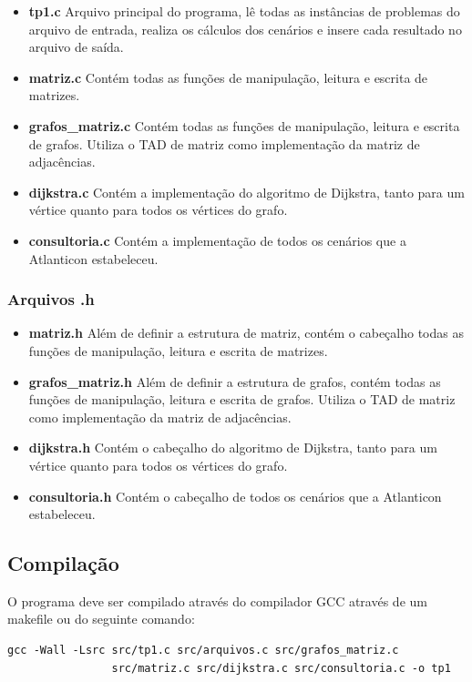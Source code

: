 \documentclass[12pt]{article}
\begin{document}
\begin{itemize}
\item \textbf{tp1.c} Arquivo principal do programa, lê todas as instâncias de problemas do arquivo de entrada, realiza os cálculos dos cenários e insere cada resultado no arquivo de saída.
\item \textbf{matriz.c} Contém todas as funções de manipulação, leitura e escrita de matrizes.
\item \textbf{grafos\_matriz.c} Contém todas as funções de manipulação, leitura e escrita de grafos. Utiliza o TAD de matriz como implementação da matriz de adjacências.
\item \textbf{dijkstra.c} Contém a implementação do algoritmo de Dijkstra, tanto para um vértice quanto para todos os vértices do grafo.
\item \textbf{consultoria.c} Contém a implementação de todos os cenários que a Atlanticon estabeleceu.
\end{itemize}

\subsubsection{Arquivos .h}

\begin{itemize}
\item \textbf{matriz.h} Além de definir a estrutura de matriz, contém o cabeçalho todas as funções de manipulação, leitura e escrita de matrizes.
\item \textbf{grafos\_matriz.h} Além de definir a estrutura de grafos, contém todas as funções de manipulação, leitura e escrita de grafos. Utiliza o TAD de matriz como implementação da matriz de adjacências.
\item \textbf{dijkstra.h} Contém o cabeçalho do algoritmo de Dijkstra, tanto para um vértice quanto para todos os vértices do grafo.
\item \textbf{consultoria.h} Contém o cabeçalho de todos os cenários que a Atlanticon estabeleceu.
\end{itemize}

\subsection{Compilação}

O programa deve ser compilado através do compilador GCC através de um makefile ou do seguinte comando:

\begin{footnotesize}
\begin{verbatim}
gcc -Wall -Lsrc src/tp1.c src/arquivos.c src/grafos_matriz.c
                src/matriz.c src/dijkstra.c src/consultoria.c -o tp1 \end{verbatim}
\end{footnotesize}
\end{document}
